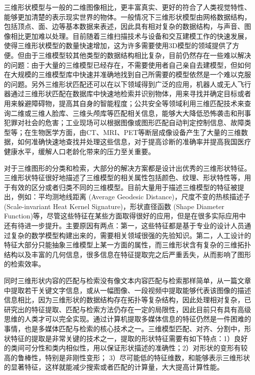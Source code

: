 \documentclass[twoside,UTF8]{nputhesis}
\begin{document}
三维形状模型与一般的二维图像相比，更丰富真实、更好的符合了人类视觉特性、能够更加清楚的表示现实世界的物体。一般情况下三维形状模型由网格数据结构，包括顶点、面、边等基本数据来表述，因此具有相对复杂的数据结构，与声音、图像相比更加难以处理。目前随着三维扫描技术与设备和交互建模工作的快速发展，使得三维形状模型的数量快速增加，这为许多需要使用3D模型的领域提供了方便。但由于三维模型较其他类型的数据结构相比复杂，目前仍然存在一些难以解决的问题：由于大量的三维模型已经存在，不需要使用者自己亲自去建模型，但如何在大规模的三维模型库中快速并准确地找到自己所需要的模型依然是一个难以克服的问题。另外三维形状匹配还可以在以下领域得到广泛的应用，机器人或无人飞行器通过三维形状匹配在数据库中快速地检索并识别物体，用来寻找并确定目标或者用来躲避障碍物，提高其自身的智能程度；公共安全等领域利用三维匹配技术来查询二维或三维人脸库、三维头颅库等匹配相关信息，能够大大降低恐怖袭击和刑事犯罪对社会的危害；工业现场可以根据图像或图形匹配自动判定控制信息、故障类型等；在生物医学方面，由CT、MRI、PET等断层成像设备产生了大量的三维数据，如何准确快速地查找并处理这些信息，对于提高诊断的准确率并提高我国医疗健康水平，缓解人口老龄化带来的压力至关重要。

对于三维图形的分类和检索，大部分的解决方案都是设计出优秀的三维形状特征。三维形状特征很好地描述了三维模型的相关属性包括颜色、纹理、形状特性等，用于有效的区分或者归类不同的三维模型。目前大量用于描述三维模型的特征被提出，例如：平均测地线距离 (Average Geodesic Distance)，尺度不变的热核描述子 (Scale-invariant Heat Kernel Signature)，形状直径函数 (Shape Diameter Function)等，尽管这些特征在某些方面取得很好的应用，但是在很多实际应用中还有待进一步提升。主要原因有两点：第一，这些特征都是基于专业的设计人员通过复杂的数学模型构建出来的，需要相关领域很强的先验知识。第二，人工设计的特征大部分只能抽象三维模型上某一方面的属性，而三维形状含有复杂的三维拓扑结构以及丰富的几何信息，很多信息在特征提取完之后严重丢失，从而影响了图形的检索效率。

同时三维形状内容的匹配与检索没有像文本内容匹配与检索那样简单，从一篇文章中提取若干关键文字信息，或从一幅图像、一段视频中提取能够代表该图像的描述信息相比，因为三维形状的数据结构存在拓扑等复杂结构，因此处理相对复杂，已研究出的特征提取、匹配与检索方法仍存在一定的局限性，因此目前只有具有高级思维的人类才可以完全实现。通过计算机提取多媒体信息的特征仍然是一件困难的事情，也是多媒体匹配与检索的核心技术之一\cite{Tangelder2008A, Funkhouser2005Shape}。三维模型匹配、对齐、分割中，形状特征的提取是非常关键的技术之一，提取的形状特征需要有如下特点：1）良好的类间可分性和类内相似性，用以保证形状描述的准确性；2）对形状的变形有较高的鲁棒性，特别是非刚性变形； 3）尽可能低的特征维数，和能够表示三维形状的显著特征，这样就能减少搜索或者匹配的计算量，大大提高计算性能。
\end{document}
